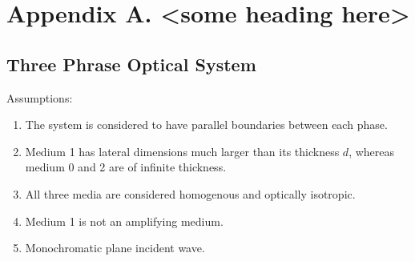 \documentclass{article}
\begin{document}
\setcounter{equation}{0}

\section*{Appendix A. <some heading here>}

\subsection*{Three Phrase Optical System}

Assumptions:
\begin{enumerate}
    \item The system is considered to have parallel boundaries between each phase.
    \item Medium 1 has lateral dimensions much larger than its thickness \(d\), whereas 
        medium 0 and 2 are of infinite thickness.
    \item All three media are considered homogenous and optically isotropic.
    \item Medium 1 is not an amplifying medium.
    \item Monochromatic plane incident wave. 
\end{enumerate} 



\end{document}
